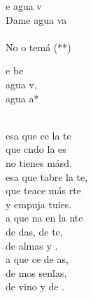 \documentclass[12pt]{article}
\begin{document}
\begin{multicols*}{2}
\begin{cancion}%
	e agua v \\
	Dame agua va \\
{}\vspace*{-0.4cm}\\
	No o temá (**)\\
\end{cancion}%

\begin{cancion}%
	\begin{chorus}%
	e be \\
	 agua v,\\
	 agua a*\\
	\end{chorus}%
	\jump\\
	esa que ce la te \\
	que cndo la es \\
	no tienes másd. \\
	esa que tabre la te,  \\
	que teace más rte  \\
	y empuja tuies.\\
	a que na en la nte  \\
	de das, de te,  \\
	de almas y . \\
	a que ce de as, \\
	de mos senlas,  \\
	de vino y de . \\
\end{cancion}%


\end{multicols*}
\end{document}
